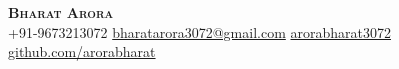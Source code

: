 \begin{center}
    \textbf{\Huge \scshape Bharat Arora} \\ \vspace{10pt}
     \small +91-9673213072 \qquad
    \href{mailto:fibharatarora3072stlast@gmail.com}{ bharatarora3072@gmail.com} \qquad
    \href{https://www.linkedin.com/in/arorabharat3072}{ arorabharat3072} \qquad
    \href{https://github.com/arorabharat}{ github.com/arorabharat}
\end{center}